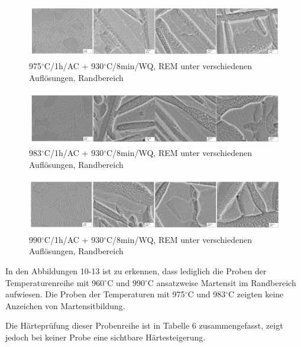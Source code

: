 \begin{figure}[!]
	\centering
	\includegraphics[width=0.9\linewidth]{"Bilder/Abbildung 11"}
	\caption[Abbildung 11]{975$^\circ$C/1h/AC + 930$^\circ$C/8min/WQ, REM unter verschiedenen Auflösungen, Randbereich}
	\label{fig:abbildung-11}
\end{figure}

\begin{figure}[!]
	\centering
	\includegraphics[width=0.9\linewidth]{"Bilder/Abbildung 12"}
	\caption[Abbildung 12]{983$^\circ$C/1h/AC + 930$^\circ$C/8min/WQ, REM unter verschiedenen Auflösungen, Randbereich}
	\label{fig:abbildung-12}
\end{figure}

\begin{figure}[!]
	\centering
	\includegraphics[width=0.9\linewidth]{"Bilder/Abbildung 13"}
	\caption[Abbildung 13]{990$^\circ$C/1h/AC + 930$^\circ$C/8min/WQ, REM unter verschiedenen Auflösungen, Randbereich}
	\label{fig:abbildung-13}
\end{figure}

In den Abbildungen 10-13 ist zu erkennen, dass lediglich die Proben der Temperaturenreihe mit 960$^\circ$C und 990$^\circ$C ansatzweise Martensit im Randbereich aufwiesen. Die Proben der Temperaturen mit 975$^\circ$C und 983$^\circ$C zeigten keine Anzeichen von Martensitbildung.

Die Härteprüfung dieser Probenreihe ist in Tabelle 6 zusammengefasst, zeigt jedoch bei keiner Probe eine sichtbare Härtesteigerung.

